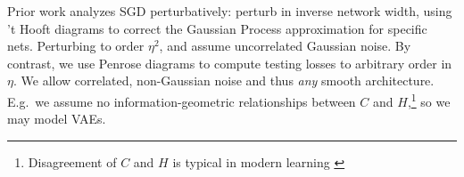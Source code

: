 \documentclass[anon,12pt]{colt2021} %
\newcommand{\wasq}[1]{\left[#1\right]}
\begin{document}
            Prior work analyzes SGD perturbatively: \cite{dy19} perturb in
            inverse network width, using 't Hooft diagrams to correct the
            Gaussian Process approximation for specific nets.  Perturbing
            to order $\eta^2$, \cite{ch18} and \cite{li17} assume uncorrelated
            Gaussian noise.  By contrast, we use Penrose diagrams \cite{pe71} to compute
            testing losses to arbitrary order in $\eta$.  We allow correlated,
            non-Gaussian noise and thus \emph{any} smooth architecture.  E.g.\
            we assume no information-geometric relationships between $C$ and
            $H$,\footnote{
                Disagreement of $C$ and
                $H$ is typical in modern learning \citep{ro12, ku19}
            } so we may model VAEs. 
            \nopagebreak
                \newcommand{\AAA}{\nabla_\mu}
                \newcommand{\BBB}{\nabla_\nu}
                \newcommand{\CCC}{\nabla_\lambda}
                \newcommand{\DDD}{\nabla_\sigma}
                \newcommand{\EEE}{\nabla_\rho}
                \newcommand{\FFF}{\nabla_\pi}
                \newcommand{\ww}[1]{\CC\wasq{#1}}
                \newcommand{\rRr}[1]{{\color{moor}#1}}
                \newcommand{\gGg}[1]{{\color{moog}#1}}
                \newcommand{\bBb}[1]{{\color{moob}#1}}
\end{document}
